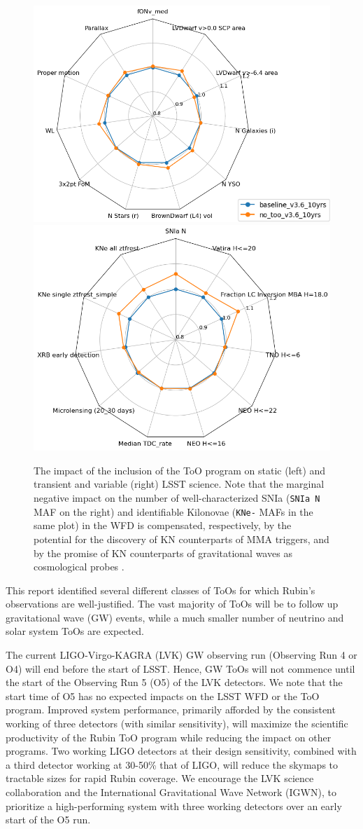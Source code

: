 \begin{figure}
  \centering
    \includegraphics[height=0.38\linewidth]{figures/baseline_v36_wfd_static.png}\includegraphics[height=0.38\linewidth]{figures/baseline_v36_wfd_transient.png}
    \caption{The impact of the inclusion of the ToO program on static (left) and transient and variable (right) LSST science. Note that the marginal negative impact on the number of well-characterized SNIa (\texttt{SNIa N} MAF on the right) and identifiable Kilonovae (\texttt{KNe-} MAFs in the same plot) in the WFD is compensated, respectively, by the potential for the discovery of KN counterparts of MMA triggers, and by the promise of KN counterparts of gravitational waves as cosmological probes \citep[\eg ,][]{PhysRevResearch.2.022006, gianfagna2024potential}.}
    \label{fig:too}
\end{figure}
This report identified several different classes of ToOs for which Rubin's observations are well-justified. The vast majority of ToOs will be to follow up gravitational wave (GW) events, while a much smaller number of neutrino and solar system ToOs are expected. 

The current LIGO-Virgo-KAGRA (LVK) GW observing run (Observing Run 4 or O4) will end before the start of LSST. Hence, GW ToOs will not commence until the start of the Observing Run 5 (O5) of the LVK detectors. We note that the start time of O5 has no expected impacts on the LSST WFD or the ToO program. Improved system performance, primarily afforded by the consistent working of three detectors (with similar sensitivity), will maximize the scientific productivity of the Rubin ToO program while reducing the impact on other programs. Two working LIGO detectors at their design sensitivity, combined with a third detector working at 30-50\% that of LIGO, will reduce the skymaps to tractable sizes for rapid Rubin coverage. We encourage the LVK science collaboration and the International Gravitational Wave Network (IGWN), to prioritize a high-performing system with three working detectors over an early start of the O5 run. 

